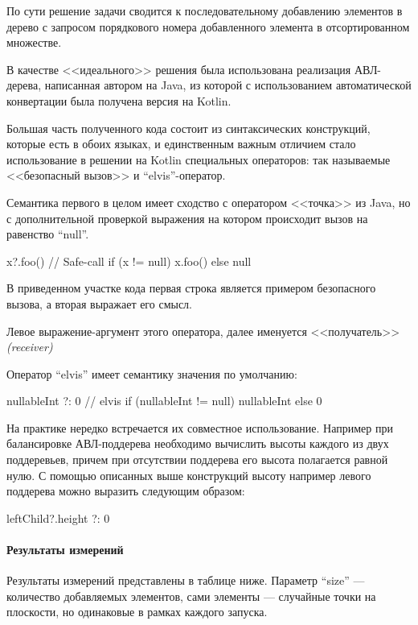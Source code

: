 По сути решение задачи сводится к последовательному добавлению элементов в дерево с запросом
порядкового номера добавленного элемента в отсортированном множестве.

В качестве <<идеального>> решения была использована реализация АВЛ-дерева, написанная автором
на Java, из которой с использованием автоматической конвертации была получена версия на Kotlin.

Большая часть полученного кода состоит из синтаксических конструкций, которые есть в обоих языках,
и единственным важным отличием стало использование в решении на Kotlin специальных операторов:
так называемые <<безопасный вызов>> и ``elvis''-оператор.

Семантика первого в целом имеет сходство с оператором <<точка>> из Java, но с дополнительной
проверкой выражения на котором происходит вызов на равенство ``null''.
\begin{pyglist}[language=kotlin]
x?.foo() // Safe-call
if (x != null) x.foo() else null
\end{pyglist}
В приведенном участке кода первая строка является примером безопасного вызова, а вторая
выражает его смысл.

Левое выражение-аргумент этого оператора, далее именуется <<получатель>> \textit{(receiver)}

Оператор ``elvis'' имеет семантику значения по умолчанию:
\begin{pyglist}[language=kotlin]
nullableInt ?: 0 // elvis
if (nullableInt != null) nullableInt else 0
\end{pyglist}

На практике нередко встречается их совместное использование.
Например при балансировке АВЛ-поддерева необходимо вычислить высоты каждого из двух поддеревьев,
причем при отсутствии поддерева его высота полагается равной нулю.
С помощью описанных выше конструкций высоту например левого поддерева можно выразить следующим
образом:
\begin{pyglist}[language=kotlin]
leftChild?.height ?: 0
\end{pyglist}

\paragraph{Результаты измерений}
Результаты измерений представлены в таблице ниже.
Параметр ``size'' --- количество добавляемых элементов, сами элементы --- случайные точки
на плоскости, но одинаковые в рамках каждого запуска.

